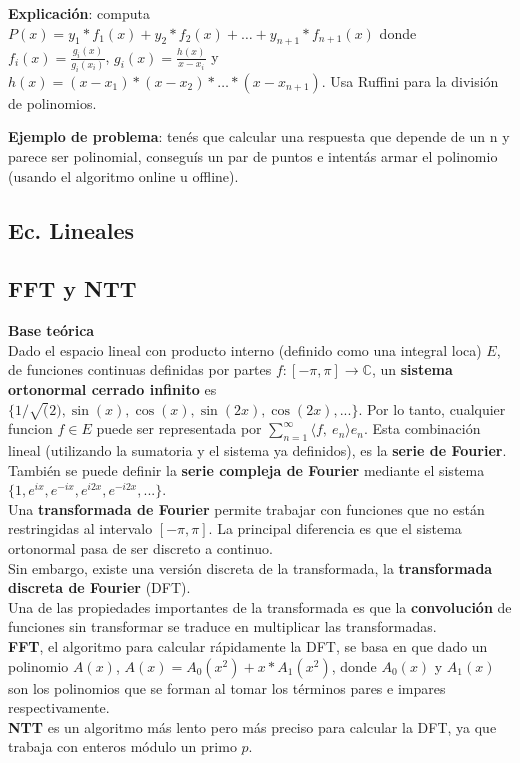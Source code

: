 \textbf{Explicación}: computa $P(x) = y_1*f_1(x) + y_2*f_2(x) + \ldots + y_{n+1}*f_{n+1}(x)$ donde $f_i(x) = \frac{g_i(x)}{g_i(x_i)}$, $g_i(x) = \frac{h(x)}{x - x_i}$ y $h(x) = (x-x_1)*(x-x_2)*\ldots*(x-x_{n+1})$.
Usa Ruffini para la división de polinomios.

\textbf{Ejemplo de problema}: tenés que calcular una respuesta que depende de un n y parece ser polinomial, conseguís un par de puntos e 
intentás armar el polinomio (usando el algoritmo online u offline).

\subsection{Ec. Lineales}
\subsection{FFT y NTT}

\textbf{Base teórica} \\
Dado el espacio lineal con producto interno (definido como una integral loca) 
$E$, de funciones continuas definidas por partes $f \colon [-\pi, \pi] \rightarrow \mathbb{C}$, 
un \textbf{sistema ortonormal cerrado infinito} es $\{1/\sqrt(2), \sin(x), \cos(x), \sin(2x), 
\cos(2x), ...\}$.  Por lo tanto, cualquier funcion $f \in E$ puede ser representada por 
$\sum_{n=1}^{\infty} \langle f,\ e_n \rangle e_n$. Esta combinación lineal (utilizando
la sumatoria y el sistema ya definidos), es la \textbf{serie de Fourier}. \\ 
También se puede definir la \textbf{serie compleja de Fourier} mediante el
sistema $\{1, e^{ix}, e^{-ix}, e^{i2x}, e^{-i2x}, ...\}$. \\
Una \textbf{transformada de Fourier} permite trabajar con funciones que no están
restringidas al intervalo $[-\pi, \pi]$. La principal diferencia es que el sistema
ortonormal pasa de ser discreto a continuo. \\
Sin embargo, existe una versión discreta de la transformada, la \textbf{transformada 
discreta de Fourier} (DFT). \\
Una de las propiedades importantes de la transformada es que la \textbf{convolución} 
de funciones sin transformar se traduce en multiplicar las transformadas. \\
\textbf{FFT}, el algoritmo para calcular rápidamente la DFT, se basa en que
dado un polinomio $A(x)$, $A(x) = A_0(x^2) + x*A_1(x^2)$, donde $A_0(x)$ y $A_1(x)$ 
son los polinomios que se forman al tomar los términos pares e impares respectivamente. \\
\textbf{NTT} es un algoritmo más lento pero más preciso para calcular la DFT,
ya que trabaja con enteros módulo un primo $p$.

